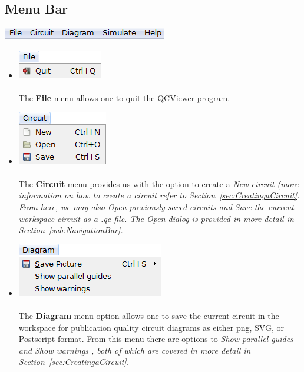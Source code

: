 \documentclass[10pt]{article}
\theoremstyle{definition}
\begin{document}
\subsection{Menu Bar}\label{sub:MenuBar}

\begin{center}
\includegraphics{Figures/Menu/MenuBar.png}
\end{center}

\begin{itemize}
\item \includegraphics{Figures/Menu/File.png} \\ \\
The {\bf File} menu allows one to quit the QCViewer program.

\item \includegraphics{Figures/Menu/Circuit.png} \\ \\
The {\bf Circuit} menu provides us with the option to create a \em New \em circuit (more information on how to create a circuit refer to  Section~\ref{sec:CreatingaCircuit}. From here, we may also \em Open \em previously saved circuits and \em Save \em the current workspace circuit as a .qc file. The \em Open \em dialog is provided in more detail in Section~\ref{sub:NavigationBar}.

\item \includegraphics{Figures/Menu/Diagram.png} \\ \\ 
The {\bf Diagram} menu option allows one to save the current circuit in the workspace for publication quality circuit diagrams as either png, SVG, or Postscript format. From this menu there are options to \em Show parallel guides \em and \em Show warnings \em, both of which are covered in more detail in Section~\ref{sec:CreatingaCircuit}.
 

\end{itemize}
\end{document}
